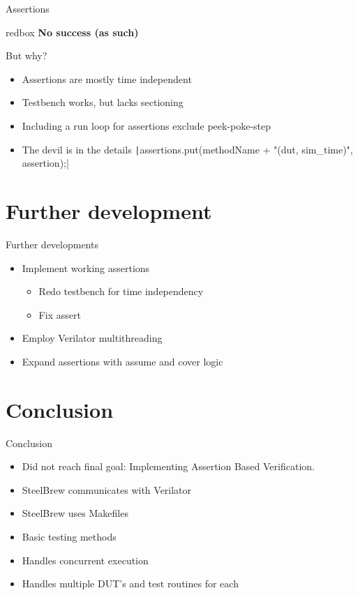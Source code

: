 \documentclass[aspectratio=169, handout]{beamer}
\begin{document}
\begin{frame}[containsverbatim]{Assertions}
    \begin{beamercolorbox}[sep=2em]{redbox}
        \textbf{No success (as such)}
    \end{beamercolorbox}
    But why?
    \begin{itemize}
        \item Assertions are mostly time independent
        \item Testbench works, but lacks sectioning
        \item Including a run loop for assertions exclude peek-poke-step
        \item The devil is in the details \texttt|assertions.put(methodName + "(dut, sim_time)", assertion);|
    \end{itemize}
\end{frame}
\section{Further development}
\begin{frame}{Further developments}
    \begin{itemize}
        \item Implement working assertions
              \begin{itemize}
                  \item Redo testbench for time independency \faCheckCircle
                  \item Fix assert \faCheckCircle
              \end{itemize}
        \item Employ Verilator multithreading \faTimesCircle
        \item Expand assertions with assume and cover logic \faTimesCircle
    \end{itemize}
\end{frame}
\section{Conclusion}
\begin{frame}{Conclusion}
    \begin{itemize}
        \item Did not reach final goal: Implementing Assertion Based Verification.
        \item SteelBrew communicates with Verilator
        \item SteelBrew uses Makefiles
        \item Basic testing methods
        \item Handles concurrent execution
        \item Handles multiple DUT's and test routines for each
    \end{itemize}
\end{frame}
\end{document}
